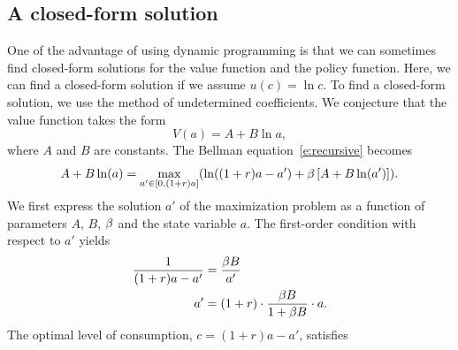 \documentclass[letterpaper, 11pt, leqno]{article}
\begin{document}
\subsection{A closed-form solution}\label{guess}

One of the advantage of using dynamic programming is that we can sometimes find closed-form solutions for the value function and the policy function. Here, we can find a closed-form solution if we assume $u(c)=\ln{c}$. To find a closed-form solution, we use the method of undetermined coefficients. We conjecture that the value function takes the form
\begin{equation}
V(a)=A+B \ln{a}\label{e:fun},
\end{equation}
where $A$ and $B$ are constants. The Bellman equation~\eqref{e:recursive} becomes
\begin{equation}
A+B \ln{a}=\max[a'\in[0,(1+r) a]]{\ln{(1+r) a-a'}+\b \bs{A+B \ln{a'}}}.
\label{e:AB}\end{equation}
We first express the solution $a'$ of the maximization problem as a function of parameters $A$, $B$, $\beta$ and the state variable $a$. The first-order condition with respect to $a'$ yields
\begin{align}
\frac{1}{(1+r) a-a'}&=\frac{\beta B}{a'}\nonumber\\
a'&=(1+r) \cdot \frac{\beta B}{1+\beta B} \cdot a \label{e:focAB}.
\end{align}
The optimal level of consumption, $c=(1+r) a-a'$, satisfies
\end{document}
